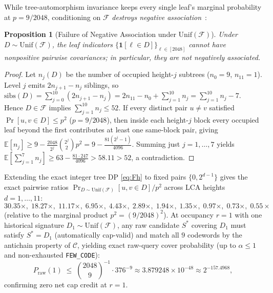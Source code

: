 \documentclass[11pt,a4paper]{article}
\newtheorem{proposition}[theorem]{Proposition}
\theoremstyle{definition}
\theoremstyle{remark}
\newcommand{\Unif}{\mathrm{Unif}}
\newcommand{\calF}{\mathcal{F}}
\newcommand{\calC}{\mathcal{C}}
\begin{document}
While tree-automorphism invariance keeps every single leaf's marginal probability at $p = 9 / 2048$, conditioning on $\calF$ \emph{destroys negative association}~\cite{joagdev1983na}:

\begin{proposition}[Failure of Negative Association under $\Unif(\calF)$]
\label{prop:na-fails}
Under $D \sim \Unif(\calF)$, the leaf indicators $\{\mathbf{1}[\ell \in D]\}_{\ell \in [2048]}$ cannot have nonpositive pairwise covariances; in particular, they are not negatively associated.
\end{proposition}
\begin{proof}
Let $n_j(D)$ be the number of occupied height-$j$ subtrees ($n_0 = 9$, $n_{11} = 1$). Level $j$ emits $2 n_{j+1} - n_j$ siblings, so $\mathrm{sibs}(D) = \sum_{j=0}^{10}(2 n_{j+1} - n_j) = 2 n_{11} - n_0 + \sum_{j=1}^{10} n_j = \sum_{j=1}^{10} n_j - 7$. Hence $D \in \calF$ implies $\sum_{j=1}^{10} n_j \le 52$. If every distinct pair $u \neq v$ satisfied $\Pr[u, v \in D] \le p^2$ ($p = 9/2048$), then inside each height-$j$ block every occupied leaf beyond the first contributes at least one same-block pair, giving $\mathbb{E}[n_j] \ge 9 - \frac{2048}{2^j}\binom{2^j}{2} p^2 = 9 - \frac{81(2^j - 1)}{4096}$. Summing just $j = 1,\dots,7$ yields $\mathbb{E}[\sum_{j=1}^7 n_j] \ge 63 - \frac{81 \cdot 247}{4096} > 58.11 > 52$, a contradiction.
\end{proof}

Extending the exact integer tree DP \eqref{eq:Fh} to fixed pairs $\{0, 2^{d-1}\}$ gives the exact pairwise ratios $\Pr_{D \sim \Unif(\calF)}[u,v \in D] / p^2$ across LCA heights $d = 1,\dots,11$:
\[
  30.35\times,\; 18.27\times,\; 11.17\times,\; 6.95\times,\; 4.43\times,\; 2.89\times,\; 1.94\times,\; 1.35\times,\; 0.97\times,\; 0.73\times,\; 0.55\times
\]
(relative to the marginal product $p^2 = (9/2048)^2$). At occupancy $r = 1$ with one historical signature $D_1 \sim \Unif(\calF)$, any raw candidate $S^*$ covering $D_1$ must satisfy $S^* = D_1$ (automatically cap-valid) and match all $9$ codewords by the antichain property of $\calC$, yielding exact raw-query cover probability (up to $\alpha \le 1$ and non-exhausted \texttt{FEW\_CODE}):
\begin{equation}
\label{eq:r1}
  P_{\mathrm{raw}}(1) \;\le\; \binom{2048}{9}^{-1} \cdot 376^{-9} \approx 3.879248 \times 10^{-48} \approx 2^{-157.4968},
\end{equation}
confirming zero net cap credit at $r = 1$.
\end{document}
